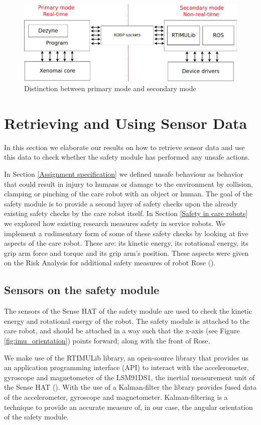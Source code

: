 \documentclass[12pt]{scrreprt}
\begin{document}
\begin{figure}[H]
    \centering
    \includegraphics[width=\textwidth]{Figures/results/communication_scheme.png}
    \caption{Distinction between primary mode and secondary mode}
    \label{fig:communication_scheme}
\end{figure}

\newpage
\section{Retrieving and Using Sensor Data}
\label{Retrieving and Using Sensor Data}
In this section we elaborate our results on how to retrieve sensor data and use this data to check whether the safety module has performed any unsafe actions.
\par
In Section \ref{Assignment specification} we defined unsafe behaviour as behavior that could result in injury to humans or damage to the environment by collision, clamping or pinching of the care robot with an object or human. The goal of the safety module is to provide a second layer of safety checks upon the already existing safety checks by the care robot itself. In Section \ref{Safety in care robots} we explored how existing research measures safety in service robots. We implement a rudimentary form of some of these safety checks by looking at five aspects of the care robot. These are: its kinetic energy, its rotational energy, its grip arm force and torque and its grip arm's position. These aspects were given on the Risk Analysis for additional safety measures of robot Rose (\cite{risk_analysis_additional}).

\subsection{Sensors on the safety module}
The sensors of the Sense HAT of the safety module are used to check the kinetic energy and rotational energy of the robot. The safety module is attached to the care robot, and should be attached in a way such that the x-axis (see Figure \ref{fig:imu_orientation}) points forward; along with the front of Rose.
\par
We make use of the RTIMULib library, an open-source library that provides us an application programming interface (API) to interact with the accelerometer, gyroscope and magnetometer of the LSM91DS1, the inertial measurement unit of the Sense HAT (\cite{rtimulib}). With the use of a Kalman-filter the library provides fused data of the accelerometer, gyroscope and magnetometer. Kalman-filtering is a technique to provide an accurate measure of, in our case, the angular orientation of the safety module.
\end{document}
